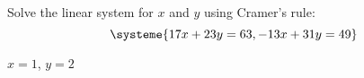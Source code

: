 
\begin{Exercise}[
name={},
title={}, 
difficulty=0,
origin={\cite{AG}}]
Solve the linear system for $x$ and $y$ using Cramer's rule:
$$
\systeme{
17x+  23y =63,
-13x+  31y =49}
$$

\end{Exercise}

\begin{Answer}
$x=1$, $y=2$
\end{Answer}
